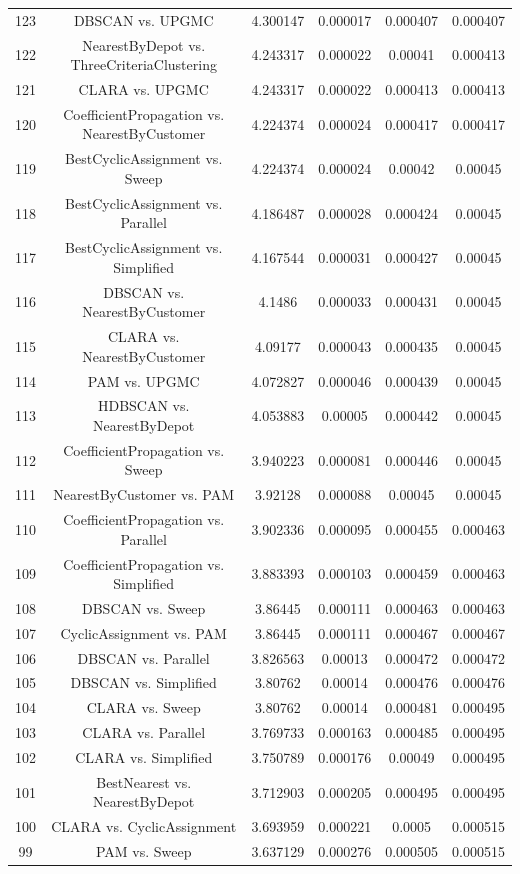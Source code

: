 \documentclass[a4paper,10pt]{article}
\begin{document}
\begin{landscape}
\begin{table}[!htp]
\begin{tabular}{cccccc}
123&DBSCAN vs. UPGMC&4.300147&0.000017&0.000407&0.000407\\
122&NearestByDepot vs. ThreeCriteriaClustering&4.243317&0.000022&0.00041&0.000413\\
121&CLARA vs. UPGMC&4.243317&0.000022&0.000413&0.000413\\
120&CoefficientPropagation vs. NearestByCustomer&4.224374&0.000024&0.000417&0.000417\\
119&BestCyclicAssignment vs. Sweep&4.224374&0.000024&0.00042&0.00045\\
118&BestCyclicAssignment vs. Parallel&4.186487&0.000028&0.000424&0.00045\\
117&BestCyclicAssignment vs. Simplified&4.167544&0.000031&0.000427&0.00045\\
116&DBSCAN vs. NearestByCustomer&4.1486&0.000033&0.000431&0.00045\\
115&CLARA vs. NearestByCustomer&4.09177&0.000043&0.000435&0.00045\\
114&PAM vs. UPGMC&4.072827&0.000046&0.000439&0.00045\\
113&HDBSCAN vs. NearestByDepot&4.053883&0.00005&0.000442&0.00045\\
112&CoefficientPropagation vs. Sweep&3.940223&0.000081&0.000446&0.00045\\
111&NearestByCustomer vs. PAM&3.92128&0.000088&0.00045&0.00045\\
110&CoefficientPropagation vs. Parallel&3.902336&0.000095&0.000455&0.000463\\
109&CoefficientPropagation vs. Simplified&3.883393&0.000103&0.000459&0.000463\\
108&DBSCAN vs. Sweep&3.86445&0.000111&0.000463&0.000463\\
107&CyclicAssignment vs. PAM&3.86445&0.000111&0.000467&0.000467\\
106&DBSCAN vs. Parallel&3.826563&0.00013&0.000472&0.000472\\
105&DBSCAN vs. Simplified&3.80762&0.00014&0.000476&0.000476\\
104&CLARA vs. Sweep&3.80762&0.00014&0.000481&0.000495\\
103&CLARA vs. Parallel&3.769733&0.000163&0.000485&0.000495\\
102&CLARA vs. Simplified&3.750789&0.000176&0.00049&0.000495\\
101&BestNearest vs. NearestByDepot&3.712903&0.000205&0.000495&0.000495\\
100&CLARA vs. CyclicAssignment&3.693959&0.000221&0.0005&0.000515\\
99&PAM vs. Sweep&3.637129&0.000276&0.000505&0.000515\\

\end{tabular}
\end{table}
\end{landscape}
\end{document}
